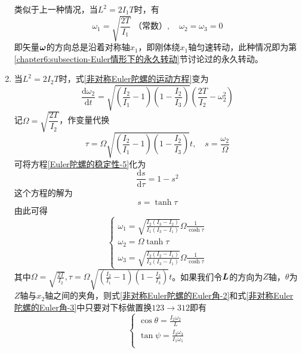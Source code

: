\begin{enumerate}
类似于上一种情况，当$L^2=2I_1T$时，有
\begin{equation*}
	\omega_1 = \sqrt{\frac{2T}{I_1}}\,\,\text{（常数）},\quad \omega_2 = \omega_3 = 0
\end{equation*}
即矢量$\boldsymbol{\omega}$的方向总是沿着对称轴$x_1$，即刚体绕$x_1$轴匀速转动，此种情况即为第\ref{chapter6:subsection-Euler情形下的永久转动}节讨论过的永久转动。

\item 当$L^2=2I_2T$时，式\eqref{非对称Euler陀螺的运动方程}变为
\begin{equation}
	\frac{\mathrm{d}\omega_2}{\mathrm{d}t} = \sqrt{\left(\frac{I_2}{I_1}-1\right)\left(1-\frac{I_2}{I_3}\right)}\left(\frac{2T}{I_2}-\omega_2^2\right)
	\label{Euler陀螺的稳定性-5}
\end{equation}
记$\varOmega = \sqrt{\dfrac{2T}{I_2}}$，作变量代换
\begin{equation}
	\tau = \varOmega\sqrt{\left(\frac{I_2}{I_1}-1\right)\left(1-\frac{I_2}{I_3}\right)} t,\quad s = \frac{\omega_2}{\varOmega}
	\label{Euler陀螺的稳定性-6}
\end{equation}
可将方程\eqref{Euler陀螺的稳定性-5}化为
\begin{equation*}
	\frac{\mathrm{d}s}{\mathrm{d}\tau} = 1-s^2
\end{equation*}
这个方程的解为
\begin{equation}
	s = \tanh \tau
\end{equation}
由此可得
\begin{equation}
\begin{cases}
	\displaystyle \omega_1 = \sqrt{\frac{I_2(I_3-I_2)}{I_1(I_3-I_1)}}\varOmega \frac{1}{\cosh \tau} \\
	\displaystyle \omega_2 = \varOmega \tanh \tau \\
	\displaystyle \omega_3 = \sqrt{\frac{I_2(I_2-I_1)}{I_3(I_3-I_1)}}\varOmega \frac{1}{\cosh \tau}
	\label{Euler陀螺的稳定性-7}
\end{cases}
\end{equation}
其中$\displaystyle \varOmega = \sqrt{\frac{2T}{I_2}},\tau = \varOmega\sqrt{\left(\frac{I_2}{I_1}-1\right)\left(1-\frac{I_2}{I_3}\right)} t$。如果我们令$\boldsymbol{L}$的方向为$Z$轴，$\theta$为$Z$轴与$x_2$轴之间的夹角，则式\eqref{非对称Euler陀螺的Euler角-2}和式\eqref{非对称Euler陀螺的Euler角-3}中只要对下标做置换$123\to 312$即有
\begin{equation}
\begin{cases}
	\displaystyle \cos\theta = \frac{I_2\omega_2}{L} \\[1.5ex]
	\displaystyle \tan\psi = \frac{I_3\omega_3}{I_1\omega_1} \\[1.5ex]

\end{cases}
\end{equation}
\end{enumerate}
